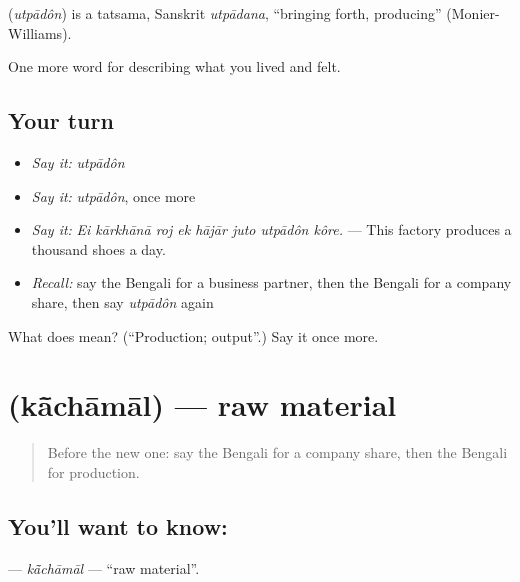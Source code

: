\begin{cousinweb}
\textbf{} (\emph{utpādôn}) is a tatsama, Sanskrit \emph{utpādana}, \textquotedblleft{}bringing forth, producing\textquotedblright{} (Monier-Williams).
\end{cousinweb}

\begin{grammarlens}[title={What you've built}]
One more word for describing what you lived and felt.
\end{grammarlens}

\subsection*{Your turn}
\begin{itemize}
\raggedright
  \item \emph{Say it:} \emph{utpādôn}
  \item \emph{Say it:} \emph{utpādôn}, once more
  \item \emph{Say it:} \emph{Ei kārkhānā roj ek hājār juto utpādôn kôre.} — This factory produces a thousand shoes a day.
  \item \emph{Recall:} say the Bengali for a business partner, then the Bengali for a company share, then say \emph{utpādôn} again
\end{itemize}

\begin{tcolorbox}[breakable,colback=teal!4,colframe=teal!35!black,title={Before you move on}]
What does  mean? (\textquotedblleft{}Production; output\textquotedblright{}.) Say it once more.
\end{tcolorbox}
\section[\texorpdfstring{\bn{কাঁচামাল} (kā̃chāmāl)}{কাঁচামাল (kā̃chāmāl)}]{ (kā̃chāmāl) — raw material}

\label{lesson:BN-C499-kachamal}



\begin{quote}
Before the new one: say the Bengali for a company share, then the Bengali for production.
\end{quote}

\subsection*{You'll want to know: }
\textbf{} — \emph{kā̃chāmāl} — \textquotedblleft{}raw material\textquotedblright{}.

